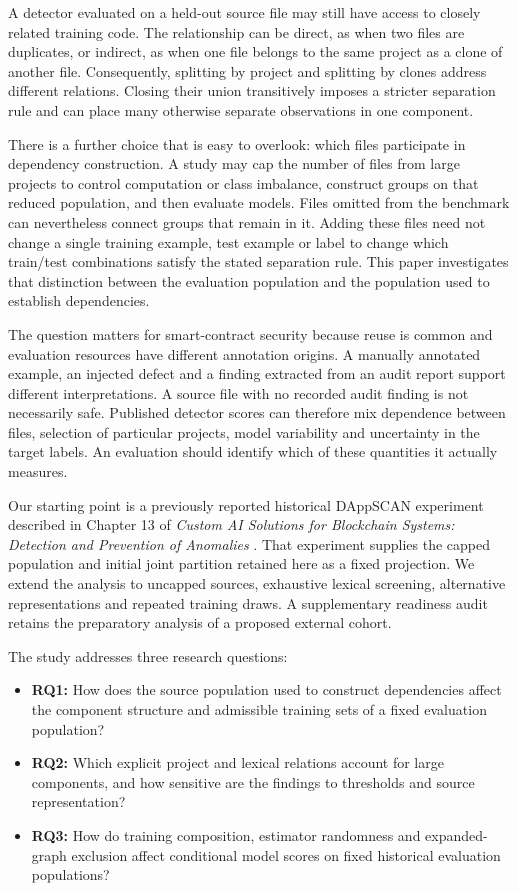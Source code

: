 \documentclass[preprint,12pt]{elsarticle}
\providecommand{\tightlist}{\setlength{\itemsep}{0pt}\setlength{\parskip}{0pt}}
\begin{document}
A detector evaluated on a held-out source file may still have access to closely related training code. The relationship can be direct, as when two files are duplicates, or indirect, as when one file belongs to the same project as a clone of another file. Consequently, splitting by project and splitting by clones address different relations. Closing their union transitively imposes a stricter separation rule and can place many otherwise separate observations in one component.

There is a further choice that is easy to overlook: which files participate in dependency construction. A study may cap the number of files from large projects to control computation or class imbalance, construct groups on that reduced population, and then evaluate models. Files omitted from the benchmark can nevertheless connect groups that remain in it. Adding these files need not change a single training example, test example or label to change which train/test combinations satisfy the stated separation rule. This paper investigates that distinction between the evaluation population and the population used to establish dependencies.

The question matters for smart-contract security because reuse is common and evaluation resources have different annotation origins. A manually annotated example, an injected defect and a finding extracted from an audit report support different interpretations. A source file with no recorded audit finding is not necessarily safe. Published detector scores can therefore mix dependence between files, selection of particular projects, model variability and uncertainty in the target labels. An evaluation should identify which of these quantities it actually measures.

Our starting point is a previously reported historical DAppSCAN experiment described in Chapter 13 of \emph{Custom AI Solutions for Blockchain Systems: Detection and Prevention of Anomalies} \cite{kuznetsovForthcomingBlockchain}. That experiment supplies the capped population and initial joint partition retained here as a fixed projection. We extend the analysis to uncapped sources, exhaustive lexical screening, alternative representations and repeated training draws. A supplementary readiness audit retains the preparatory analysis of a proposed external cohort.

The study addresses three research questions:

\begin{itemize}
\tightlist
\item
  \textbf{RQ1:} How does the source population used to construct dependencies affect the component structure and admissible training sets of a fixed evaluation population?
\item
  \textbf{RQ2:} Which explicit project and lexical relations account for large components, and how sensitive are the findings to thresholds and source representation?
\item
  \textbf{RQ3:} How do training composition, estimator randomness and expanded-graph exclusion affect conditional model scores on fixed historical evaluation populations?
\end{itemize}
\end{document}
